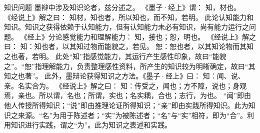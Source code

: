 \documentclass[11pt]{article}
\begin{document}
知识问题
墨辩中涉及知识论者，兹分述之。
《墨子·经上》谓：
知，材也。
《经说上》解之曰：
知材，知也者，所以知也，而不知，若明。
此论认知能力和知识。知识之获得依赖于认知能力，但有认知能力未必有知识，尚有能力运行之问题。
《经上》分论感觉能力和理解能力：
知，接也；恕，明也。
《经说上》解之曰：
知：知也者，以其知过物而能貌之，若见。
恕：恕也者，以其知论物而其知之也著，若明。
此处“知”指感觉能力，其运行产生感性印象，故曰“能貌之”。“恕”指理解能力，负责整理感性资料，所产生的知识较为明晰确定，故曰“其知之也著”。
此外，墨辩论获得知识之方法。《墨子·经上》曰：
知：闻、说、亲。名实合为。
《经说上》解之曰：
知：传受之，闻也；方不障，说也；身观焉，亲也。所以谓，名也；所谓，实也；名实耦，合也；志行，为也。
“闻”即由他人传授所得知识；“说”即由推理论证所得知识；“亲”即由实践所得知识。此为知识之来源。“名”为用于陈述者；“实”为被陈述者；“名”与“实”相符，即为“合”。利用知识进行实践，谓之“为”。此为知识之表述和实践。
  
\end{document}
